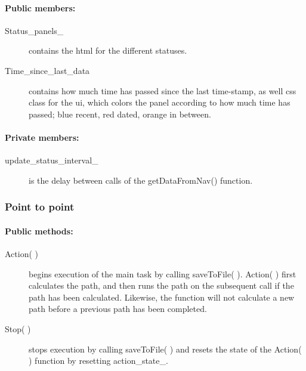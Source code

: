 \paragraph{Public members:}
\begin{adjustwidth}{2.5em}{0pt}\begin{description}
		\item [Status_panels_] contains the html for the different statuses.
		\item [Time_since_last_data] contains how much time has passed since the last time-stamp, as well css class for the ui, which colors the panel according to how much time has passed; blue recent, red dated, orange in between.
\end{description}\end{adjustwidth}


\paragraph{Private members:}
\begin{adjustwidth}{2.5em}{0pt}\begin{description}
		\item [update_status_interval_] is the delay between calls of the getDataFromNav() function.
\end{description}\end{adjustwidth}

\subsubsection{Point to point}

\paragraph{Public methods:}
\begin{adjustwidth}{2.5em}{0pt}\begin{description}
		\item [Action( )] begins execution of the main task by calling saveToFile( ). Action( ) first calculates the path, and then runs the path on the subsequent call if the path has been calculated. Likewise, the function will not calculate a new path before a previous path has been completed. 
		\item [Stop( )] stops execution by calling saveToFile( ) and resets the state of the Action( ) function by resetting action_state_.
\end{description}\end{adjustwidth}

